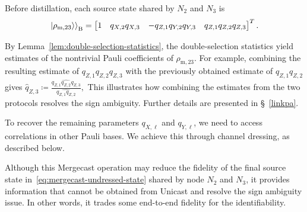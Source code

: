Before distillation, each source state shared by \(N_2\) and \(N_3\) is
\begin{equation}
    \left. \left|\rho_{\text{m},23}\right\rangle \right \rangle_{\mathrm B}
    =
    \begin{bmatrix}
        1                      &
        q_{X,2}q_{X,3}         &
        -q_{Z,1}q_{Y,2}q_{Y,3} &
        q_{Z,1}q_{Z,2}q_{Z,3}
    \end{bmatrix}^{ T}.
    \label{eq:mergecast-undressed-state}
\end{equation}


By Lemma~\ref{lem:double-selection-statistics}, the double-selection
statistics yield estimates of the nontrivial Pauli coefficients
of $\rho_{\text{m},23}$.
For example, combining the resulting estimate of
$q_{Z,1}q_{Z,2}q_{Z,3}$ with the previously obtained estimate
of $q_{Z,1}q_{Z,2}$ gives
\(
\widehat{q}_{Z,3}
\coloneqq
\frac{
    \widehat{q_{Z,1}q_{Z,2}q_{Z,3}}
}{
    \widehat{q_{Z,1}q_{Z,2}}
},
\)
This illustrates how combining the estimates from the two protocols
resolves the sign ambiguity.
Further details are presented in \S~\ref{linkpa}.


To recover the remaining parameters
\(q_{X,\ell}\) and \(q_{Y,\ell}\), we need to access correlations
in other Pauli bases. We achieve this through channel dressing,
as described below.


\begin{remark}
    Although this Mergecast operation may
    reduce the fidelity of the final source state in~\eqref{eq:mergecast-undressed-state} shared by node \(N_2\) and \(N_3\), it
    provides information that cannot be obtained from Unicast and resolve the sign ambiguity issue.
    In other words, it trades some end-to-end
    fidelity for the identifiability.
\end{remark}

